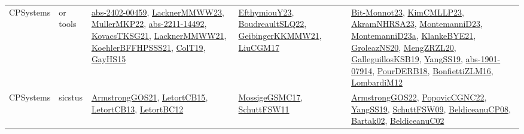 {\begin{longtable}{llp{6cm}p{6cm}p{6cm}}
CPSystems & or tools & \href{articles/abs-2402-00459.pdf}{abs-2402-00459}\cite{abs-2402-00459}, \href{articles/LacknerMMWW23.pdf}{LacknerMMWW23}\cite{LacknerMMWW23}, \href{articles/MullerMKP22.pdf}{MullerMKP22}\cite{MullerMKP22}, \href{articles/abs-2211-14492.pdf}{abs-2211-14492}\cite{abs-2211-14492}, \href{papers/KovacsTKSG21.pdf}{KovacsTKSG21}\cite{KovacsTKSG21}, \href{papers/LacknerMMWW21.pdf}{LacknerMMWW21}\cite{LacknerMMWW21}, \href{articles/KoehlerBFFHPSSS21.pdf}{KoehlerBFFHPSSS21}\cite{KoehlerBFFHPSSS21}, \href{papers/ColT19.pdf}{ColT19}\cite{ColT19}, \href{papers/GayHS15.pdf}{GayHS15}\cite{GayHS15} & \href{papers/EfthymiouY23.pdf}{EfthymiouY23}\cite{EfthymiouY23}, \href{papers/BoudreaultSLQ22.pdf}{BoudreaultSLQ22}\cite{BoudreaultSLQ22}, \href{papers/GeibingerKKMMW21.pdf}{GeibingerKKMMW21}\cite{GeibingerKKMMW21}, \href{papers/LiuCGM17.pdf}{LiuCGM17}\cite{LiuCGM17} & \href{papers/Bit-Monnot23.pdf}{Bit-Monnot23}\cite{Bit-Monnot23}, \href{papers/KimCMLLP23.pdf}{KimCMLLP23}\cite{KimCMLLP23}, \href{articles/AkramNHRSA23.pdf}{AkramNHRSA23}\cite{AkramNHRSA23}, \href{articles/MontemanniD23.pdf}{MontemanniD23}\cite{MontemanniD23}, \href{articles/MontemanniD23a.pdf}{MontemanniD23a}\cite{MontemanniD23a}, \href{papers/KlankeBYE21.pdf}{KlankeBYE21}\cite{KlankeBYE21}, \href{papers/GroleazNS20.pdf}{GroleazNS20}\cite{GroleazNS20}, \href{articles/MengZRZL20.pdf}{MengZRZL20}\cite{MengZRZL20}, \href{papers/GalleguillosKSB19.pdf}{GalleguillosKSB19}\cite{GalleguillosKSB19}, \href{papers/YangSS19.pdf}{YangSS19}\cite{YangSS19}, \href{articles/abs-1901-07914.pdf}{abs-1901-07914}\cite{abs-1901-07914}, \href{articles/PourDERB18.pdf}{PourDERB18}\cite{PourDERB18}, \href{papers/BonfiettiZLM16.pdf}{BonfiettiZLM16}\cite{BonfiettiZLM16}, \href{articles/LombardiM12.pdf}{LombardiM12}\cite{LombardiM12}\\
CPSystems & sicstus & \href{papers/ArmstrongGOS21.pdf}{ArmstrongGOS21}\cite{ArmstrongGOS21}, \href{articles/LetortCB15.pdf}{LetortCB15}\cite{LetortCB15}, \href{papers/LetortCB13.pdf}{LetortCB13}\cite{LetortCB13}, \href{papers/LetortBC12.pdf}{LetortBC12}\cite{LetortBC12} & \href{papers/MossigeGSMC17.pdf}{MossigeGSMC17}\cite{MossigeGSMC17}, \href{articles/SchuttFSW11.pdf}{SchuttFSW11}\cite{SchuttFSW11} & \href{papers/ArmstrongGOS22.pdf}{ArmstrongGOS22}\cite{ArmstrongGOS22}, \href{papers/PopovicCGNC22.pdf}{PopovicCGNC22}\cite{PopovicCGNC22}, \href{papers/YangSS19.pdf}{YangSS19}\cite{YangSS19}, \href{papers/SchuttFSW09.pdf}{SchuttFSW09}\cite{SchuttFSW09}, \href{papers/BeldiceanuCP08.pdf}{BeldiceanuCP08}\cite{BeldiceanuCP08}, \href{papers/Bartak02.pdf}{Bartak02}\cite{Bartak02}, \href{papers/BeldiceanuC02.pdf}{BeldiceanuC02}\cite{BeldiceanuC02}\\

\end{longtable}}
